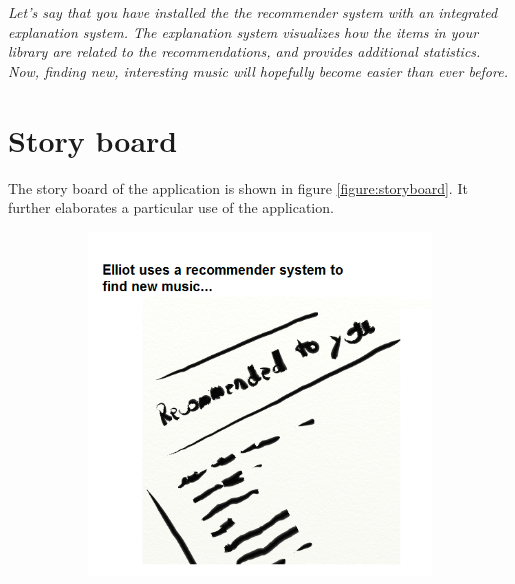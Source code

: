 \textit{Let's say that you have installed the the recommender system with an integrated explanation system. The explanation system visualizes how the items in your library are related to the recommendations, and provides additional statistics. Now, finding new, interesting music will hopefully become easier than ever before.}


\section{Story board}

The story board of the application is shown in figure \ref{figure:storyboard}. It further elaborates a particular use of the application.

\begin{figure}
	\centering
	\begin{subfigure}[t]{0.4\textwidth}
					\centering
					\includegraphics[width=\textwidth]{img/storyboard01}
					\caption{}
					\label{figure:storyboard01}
	\end{subfigure}%
	~
	\begin{subfigure}[t]{0.4\textwidth}
					\centering

\end{subfigure}
\end{figure}
